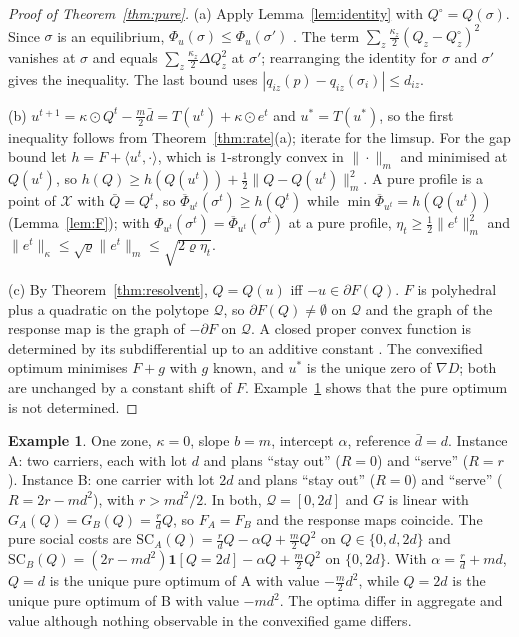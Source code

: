 \documentclass[preprint,12pt]{elsarticle}
\theoremstyle{definition}
\newtheorem{example}[theorem]{Example}
\theoremstyle{remark}
\newcommand{\ip}[2]{\langle #1,#2\rangle}
\newcommand{\cQ}{\mathcal{Q}}
\newcommand{\cX}{\mathcal{X}}
\begin{document}
\begin{proof}[Proof of Theorem~\ref{thm:pure}]
(a) Apply Lemma~\ref{lem:identity} with $Q^\circ=Q(\sigma)$. Since $\sigma$ is an equilibrium, $\Phi_u(\sigma)\le\Phi_u(\sigma')$ \citep{Monderer1996}. The term $\sum_z\tfrac{\kappa_z}{2}(Q_z-Q^\circ_z)^2$ vanishes at $\sigma$ and equals $\sum_z\tfrac{\kappa_z}{2}\Delta Q_z^2$ at $\sigma'$; rearranging the identity for $\sigma$ and $\sigma'$ gives the inequality. The last bound uses $|q_{iz}(p)-q_{iz}(\sigma_i)|\le d_{iz}$.

(b) $u^{t+1}=\kappa\odot Q^t-\tfrac m2\bar d=T(u^t)+\kappa\odot e^t$ and $u^*=T(u^*)$, so the first inequality follows from Theorem~\ref{thm:rate}(a); iterate for the limsup. For the gap bound let $h=F+\ip{u^t}\cdot$, which is $1$-strongly convex in $\|\cdot\|_m$ and minimised at $Q(u^t)$, so $h(Q)\ge h(Q(u^t))+\tfrac12\|Q-Q(u^t)\|_m^2$. A pure profile is a point of $\cX$ with $\bar Q=Q^t$, so $\overline\Phi_{u^t}(\sigma^t)\ge h(Q^t)$ while $\min\overline\Phi_{u^t}=h(Q(u^t))$ (Lemma~\ref{lem:F}); with $\Phi_{u^t}(\sigma^t)=\overline\Phi_{u^t}(\sigma^t)$ at a pure profile, $\eta_t\ge\tfrac12\|e^t\|_m^2$ and $\|e^t\|_\kappa\le\sqrt\varrho\|e^t\|_m\le\sqrt{2\varrho\eta_t}$.

(c) By Theorem~\ref{thm:resolvent}, $Q=Q(u)$ iff $-u\in\partial F(Q)$. $F$ is polyhedral plus a quadratic on the polytope $\cQ$, so $\partial F(Q)\ne\emptyset$ on $\cQ$ and the graph of the response map is the graph of $-\partial F$ on $\cQ$. A closed proper convex function is determined by its subdifferential up to an additive constant \citep[Theorem 24.9]{Rockafellar1970}. The convexified optimum minimises $F+g$ with $g$ known, and $u^*$ is the unique zero of $\nabla D$; both are unchanged by a constant shift of $F$. Example~\ref{ex:ident} shows that the pure optimum is not determined.
\end{proof}

\begin{example}\label{ex:ident}
One zone, $\kappa=0$, slope $b=m$, intercept $\alpha$, reference $\bar d=d$. Instance A: two carriers, each with lot $d$ and plans ``stay out'' ($R=0$) and ``serve'' ($R=r$). Instance B: one carrier with lot $2d$ and plans ``stay out'' ($R=0$) and ``serve'' ($R=2r-md^2$), with $r>md^2/2$. In both, $\cQ=[0,2d]$ and $G$ is linear with $G_A(Q)=G_B(Q)=\tfrac rdQ$, so $F_A=F_B$ and the response maps coincide. The pure social costs are $\mathrm{SC}_A(Q)=\tfrac rdQ-\alpha Q+\tfrac m2Q^2$ on $Q\in\{0,d,2d\}$ and $\mathrm{SC}_B(Q)=(2r-md^2)\mathbf 1[Q=2d]-\alpha Q+\tfrac m2Q^2$ on $\{0,2d\}$. With $\alpha=\tfrac rd+md$, $Q=d$ is the unique pure optimum of A with value $-\tfrac m2d^2$, while $Q=2d$ is the unique pure optimum of B with value $-md^2$. The optima differ in aggregate and value although nothing observable in the convexified game differs.
\end{example}
\end{document}
